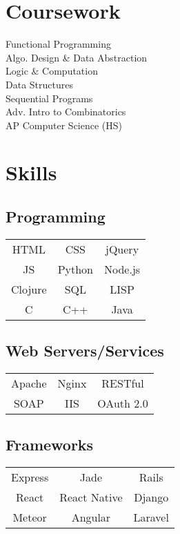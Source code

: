\documentclass[letterpaper]{deedy-resume} %
\begin{document}
\begin{minipage}[t]{0.33\textwidth}

\section{Coursework}

Functional Programming \\
Algo. Design \& Data Abstraction \\
Logic \& Computation \\
Data Structures \\
Sequential Programs \\
Adv. Intro to Combinatorics \\
AP Computer Science (HS)

\sectionspace %


\section{Skills}

\subsection{Programming}

\begin{tabular}{ c c c }
HTML    & CSS    & jQuery \\
JS      & Python & Node.js    \\
Clojure & SQL    & LISP   \\
C       & C++    & Java
\end{tabular}

\subsection{Web Servers/Services}

\begin{tabular}{ c c c }
  Apache & Nginx & RESTful \\
  SOAP & IIS & OAuth 2.0
\end{tabular}

\subsection{Frameworks}

\begin{tabular}{ c c c }
  Express & Jade & Rails \\
  React & React Native & Django \\
  Meteor & Angular & Laravel
\end{tabular}

\sectionspace %



\end{minipage} %
\end{document}
